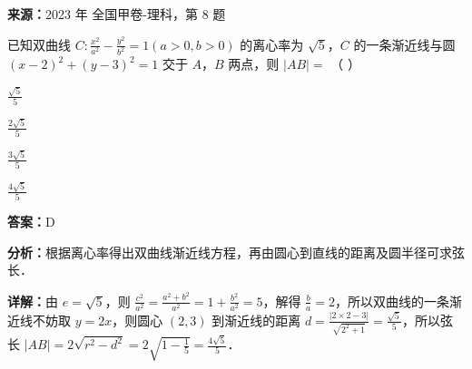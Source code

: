 \begin{question}[points=5]
\textbf{来源：}2023 年 全国甲卷-理科，第 8 题\par
已知双曲线 $C: \frac{x^2}{a^2} - \frac{y^2}{b^2} = 1 (a > 0, b > 0)$ 的离心率为 $\sqrt{5}$，$C$ 的一条渐近线与圆 $(x-2)^2 + (y-3)^2 = 1$ 交于 $A$，$B$ 两点，则 $|AB| = $ （                 ）
\begin{choices}
  \item $\frac{\sqrt{5}}{5}$
  \item $\frac{2\sqrt{5}}{5}$
  \item $\frac{3\sqrt{5}}{5}$
  \item $\frac{4\sqrt{5}}{5}$
\end{choices}
\begin{solution}
\textbf{答案：}D

\textbf{分析：}根据离心率得出双曲线渐近线方程，再由圆心到直线的距离及圆半径可求弦长．

\textbf{详解：}由 $e = \sqrt{5}$，则 $\frac{c^2}{a^2} = \frac{a^2+b^2}{a^2} = 1 + \frac{b^2}{a^2} = 5$，解得 $\frac{b}{a} = 2$，所以双曲线的一条渐近线不妨取 $y = 2x$，则圆心 $(2,3)$ 到渐近线的距离 $d = \frac{|2\times 2 - 3|}{\sqrt{2^2+1}} = \frac{\sqrt{5}}{5}$，所以弦长 $|AB| = 2\sqrt{r^2 - d^2} = 2\sqrt{1 - \frac{1}{5}} = \frac{4\sqrt{5}}{5}$．
\end{solution}
\end{question}

